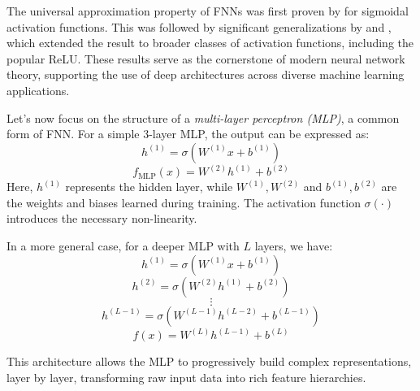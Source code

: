 \documentclass{article}
\theoremstyle{definition}
\theoremstyle{remark}
\begin{document}
The universal approximation property of FNNs was first proven by \citep{cybenko1989approximation} for sigmoidal activation functions. This was followed by significant generalizations by \citep{hornik1989multilayer} and \citep{funahashi1989approximate}, which extended the result to broader classes of activation functions, including the popular ReLU.
These results serve as the cornerstone of modern neural network theory, supporting the use of deep architectures across diverse machine learning applications.


Let’s now focus on the structure of a \textit{multi-layer perceptron (MLP)}, a common form of FNN. For a simple 3-layer MLP, the output can be expressed as:
\[
h^{(1)} = \sigma(W^{(1)} x + b^{(1)})
\]
\[
f_{\text{MLP}}(x) = W^{(2)} h^{(1)} + b^{(2)}
\]
Here, \(h^{(1)}\) represents the hidden layer, while \(W^{(1)}, W^{(2)}\) and \(b^{(1)}, b^{(2)}\) are the weights and biases learned during training. The activation function \(\sigma(\cdot)\) introduces the necessary non-linearity.




In a more general case, for a deeper MLP with \(L\) layers, we have:
\[
h^{(1)} = \sigma(W^{(1)} x + b^{(1)})
\]
\[
h^{(2)} = \sigma(W^{(2)} h^{(1)} + b^{(2)})
\]
\[
\vdots
\]
\[
h^{(L-1)} = \sigma(W^{(L-1)} h^{(L-2)} + b^{(L-1)})
\]
\[
f(x) = W^{(L)} h^{(L-1)} + b^{(L)}
\]

This architecture allows the MLP to progressively build complex representations, layer by layer, transforming raw input data into rich feature hierarchies.
\end{document}
